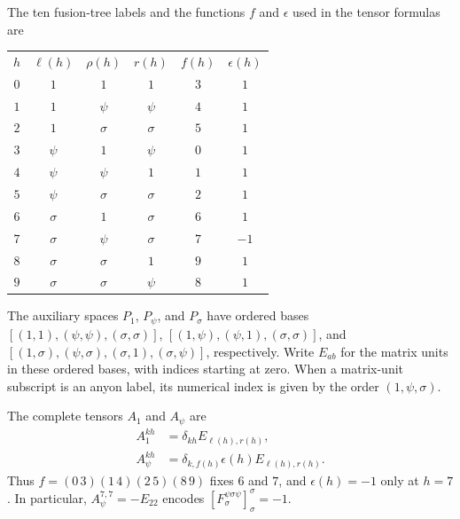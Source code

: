 \begin{definition}%
    \label{def:asymex_ising_tensors}
    \leanok
    The ten fusion-tree labels and the functions $f$ and $\epsilon$
    used in the tensor formulas are
    \begin{center}
        \begin{tabular}{c@{\quad}ccc@{\quad}cc}
            $h$ & $\ell(h)$ & $\rho(h)$ & $r(h)$   & $f(h)$ & $\epsilon(h)$ \\[2pt]
            $0$ & $1$       & $1$       & $1$      & $3$    & $1$           \\
            $1$ & $1$       & $\psi$    & $\psi$   & $4$    & $1$           \\
            $2$ & $1$       & $\sigma$  & $\sigma$ & $5$    & $1$           \\
            $3$ & $\psi$    & $1$       & $\psi$   & $0$    & $1$           \\
            $4$ & $\psi$    & $\psi$    & $1$      & $1$    & $1$           \\
            $5$ & $\psi$    & $\sigma$  & $\sigma$ & $2$    & $1$           \\
            $6$ & $\sigma$  & $1$       & $\sigma$ & $6$    & $1$           \\
            $7$ & $\sigma$  & $\psi$    & $\sigma$ & $7$    & $-1$          \\
            $8$ & $\sigma$  & $\sigma$  & $1$      & $9$    & $1$           \\
            $9$ & $\sigma$  & $\sigma$  & $\psi$   & $8$    & $1$
        \end{tabular}
    \end{center}
    The auxiliary spaces $P_1$, $P_\psi$, and $P_\sigma$ have ordered bases
    $[(1,1),(\psi,\psi),(\sigma,\sigma)]$,
    $[(1,\psi),(\psi,1),(\sigma,\sigma)]$, and
    $[(1,\sigma),(\psi,\sigma),(\sigma,1),(\sigma,\psi)]$,
    respectively. Write $E_{ab}$ for the matrix units in these ordered
    bases, with indices starting at zero. When a matrix-unit subscript
    is an anyon label, its numerical index is given by the order
    $(1,\psi,\sigma)$.

    The complete tensors $A_1$ and $A_\psi$ are
    \begin{align}
        A_1^{kh}    & =\delta_{kh}E_{\ell(h),r(h)},
        \label{eq:asymex_ising_one_letters}                        \\
        A_\psi^{kh} & =\delta_{k,f(h)}\epsilon(h)E_{\ell(h),r(h)}.
        \label{eq:asymex_ising_psi_letters}
    \end{align}
    Thus $f=(0\,3)(1\,4)(2\,5)(8\,9)$ fixes $6$ and $7$, and
    $\epsilon(h)=-1$ only at $h=7$. In particular,
    $A_\psi^{7,7}=-E_{22}$ encodes
    $[F^{\psi\sigma\psi}_{\sigma}]_{\sigma}^{\sigma}=-1$.


\end{definition}
